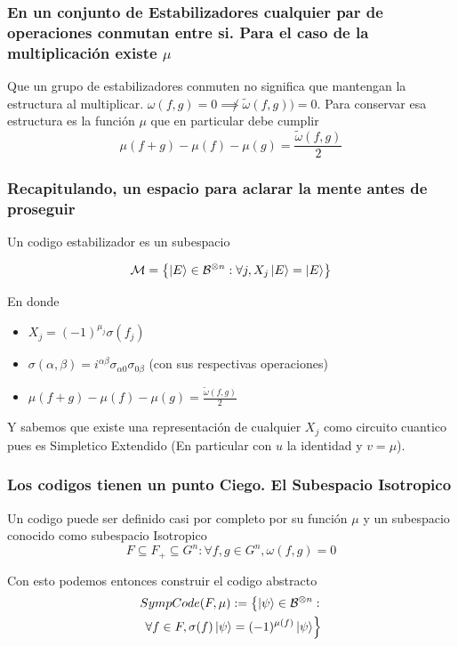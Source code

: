 \documentclass[english,9pt]{Linnaeus}
\begin{document}
\begin{frame}
  \frametitle{En un conjunto de Estabilizadores cualquier par de operaciones conmutan entre si. Para el caso de la multiplicación existe $\mu$}

  Que un grupo de estabilizadores conmuten no significa que mantengan la estructura al multiplicar. $\omega(f, g) = 0 \not\implies \tilde{\omega}(f, g)) = 0$. Para conservar esa estructura es la función $\mu$ que en particular debe cumplir
  \begin{equation}
    \mu(f + g) - \mu(f) - \mu(g) = \frac{\tilde{\omega}(f, g)}{2}
    \label{eq:mu_correction}
  \end{equation}
\end{frame}

\begin{frame}
  \frametitle{Recapitulando, un espacio para aclarar la mente antes de proseguir}

  Un codigo estabilizador es un subespacio

  \begin{equation}
    \mathcal{M} = \left\{ \ket{E} \in \mathcal{B}^{\otimes n} : \forall j, X_j \ket{E} = \ket{E}\right\}
    \label{eq:stabilizers2}
  \end{equation}

  En donde
  \begin{itemize}
    \item $X_j = (-1)^{\mu_j} \sigma(f_j)$
    \item $\sigma(\alpha, \beta) = i^{\alpha\beta} \sigma_{\alpha 0}\sigma_{0 \beta}$ (con sus respectivas operaciones)
    \item $\mu(f + g) - \mu(f) - \mu(g) = \frac{\tilde{\omega}(f, g)}{2}$
  \end{itemize}

  Y sabemos que existe una representación de cualquier $X_j$ como circuito cuantico pues es Simpletico Extendido (En particular con $u$ la identidad y $v = \mu$).
\end{frame}

\begin{frame}
  \frametitle{Los codigos tienen un punto Ciego. El Subespacio Isotropico}
  Un codigo puede ser definido casi por completo por su función $\mu$ y un subespacio conocido como subespacio Isotropico
  \begin{equation}
    F \subseteq F_+ \subseteq G^n : \forall f, g \in G^n, \omega(f, g) = 0
    \label{eq:isotropic}
  \end{equation}

  Con esto podemos entonces construir el codigo abstracto
  \begin{equation}
    \begin{split}
    SympCode(F, \mu) := \left\{\ket{\psi} \in \mathcal{B}^{\otimes n} :\right.\\
      \left.\forall f \in F, \sigma(f) \ket{\psi} = (-1)^{\mu(f)}\ket{\psi}\right\}
    \end{split}
    \label{eq:simp_abst}
  \end{equation}

\end{frame}
\end{document}
